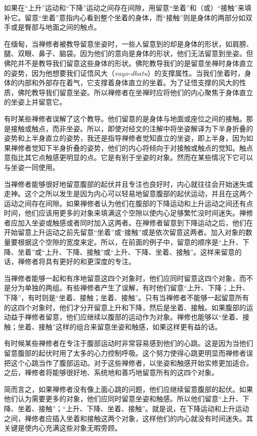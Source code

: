 如果在“上升”运动和“下降”运动之间存在间隙，用留意“坐着”和（或）“接触”来填补它。留意“坐着”意指内心看到整个坐着的身体，而“接触”则是身体的两部分如双手或是臀部与地面之间的触点。

在缅甸，当禅修者被教导留意坐姿时，一些人留意到的却是身体的形状，\1如肩膀、腿、双眼、鼻子、脑袋。因为他们的意向是身体的形状，他们无法留意到坐姿。但佛陀并不是教导我们留意这些身体的形状。佛陀教导我们的是留意坐禅时身体直立的姿势，因为他想要我们证悟风大（{\it vayo-dhatu}）的支撑属性。当我们坐着时，身体的内部和外部存在着气，它支撑着身体直立的坐着。为了证悟支撑的风大的性质，佛陀教导我们留意坐姿。所以禅修者在坐禅时应将他们的内心聚焦于身体直立的坐姿上并留意它。

有时某些禅修者误解了这个教导。他们留意的是身体与地面或座位之间的接触。那是接触或触点，而非坐姿。所以，即使对经文的注解中将坐姿解译为下半身折叠的姿势和上半身直立的姿势，我还是指导禅修者觉知直立的坐姿，即上半身，因为如果禅修者觉知下半身折叠的姿势，他们的内心将倾向于对接触或触点的觉知。触点意指比其它点触感更明显的点。它是有别于坐姿的对象。然而在某些情况下它可以与坐姿一同使用。

当禅修者能够很好地留意腹部的起伏并且专注也良好时，内心就往往会开始迷失或走神。这个之所以发生是因为内心可以轻易地留意腹部的起伏运动，并且在这两个运动之间存在间隙。如果禅修者认为他们\1在腹部的下降运动和上升运动之间还有点时间，他们应该用更多的对象来填满这个空隙以使内心足够繁忙没时间迷失。禅修者应加入坐姿或触感或者同时加入这两者。在禅修者留意到下降运动之后，他们在开始留意上升运动之前先留意“坐着”或“接触”或是依次留意这两者。加入对象的数量要根据这个空隙的宽度来定。所以，在前面的例子中，留意的顺序是“上升、下降、坐着”或“上升、下降、接触”或“上升、下降、坐着、接触”。这样来留意的话，禅修者将具有更好的和更深度的专注。

当禅修者能够一起和有序地留意这四个对象时，他们应同时留意这四个对象，而不是分为单独的两组。有些禅修者产生了误解，有时他们留意“上升、下降；上升、下降”，有时则是“坐着、接触；坐着、接触”。只有当禅修者不能够一起留意所有的这四个对象时，他们才分开留意上升和下降，然后是坐着、接触。如果腹部的运动益于禅修者留意，他们应继续以腹部的运动作为对象。禅修也能够以“坐着、接触；坐着、接触”这样的组合来留意坐姿和触感，如果这样更有益的话。

有时候某些禅修者在专注于腹部运动时非常容易感到他们的心跳。这是因为当他们留意腹部的起伏时用了太多的心力控制呼吸。这个努力使得心跳更明显而禅修者误把这个心跳当作了腹部运动。对于这些禅修者，以坐姿和触感\1开始实修更加适合。之后，禅修者将能够很好地、系统地和善巧地留意所有的这四个对象。

简而言之，如果禅修者没有像上面心跳的问题，他们应继续留意腹部的起伏。如果他们认为需要更多的对象，他们应同时留意坐姿和触感。所以他们留意“上升、下降、坐着、接触”；“上升、下降、坐着、接触”。就是说，在下降运动和上升运动之间，禅修者应插入坐着和接触这两个对象，这样他们的内心就没有时间迷失。其关键是使内心充满这些对象无暇旁顾。

